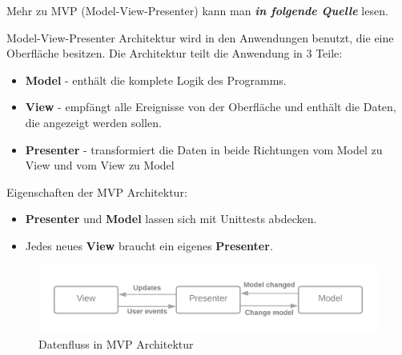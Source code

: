 Mehr zu MVP (Model-View-Presenter) kann man \textit{\textbf{in folgende Quelle}} lesen.

Model-View-Presenter Architektur wird in den Anwendungen benutzt, die eine Oberfläche besitzen.
Die Architektur teilt die Anwendung in 3 Teile:
\begin{itemize}
    \item \textbf{Model} - enthält die komplete Logik des Programms.
    \item \textbf{View} - empfängt alle Ereignisse von der Oberfläche und enthält die Daten, die angezeigt werden sollen.
    \item \textbf{Presenter} - transformiert die Daten in beide Richtungen vom Model zu View 
    und vom View zu Model
\end{itemize}


Eigenschaften der MVP Architektur:
\begin{itemize}
    \item \textbf{Presenter} und \textbf{Model} lassen sich mit Unittests abdecken.
    \item Jedes neues \textbf{View} braucht ein eigenes \textbf{Presenter}.
\end{itemize}


\begin{figure}[H]
    \centering
    \includegraphics[width=1\textwidth]{./images/MVP.png}
    \caption[Datenfluss in MVP Architektur]{Datenfluss in MVP Architektur \footnotemark}
    \label{fig:MVP}
\end{figure}
